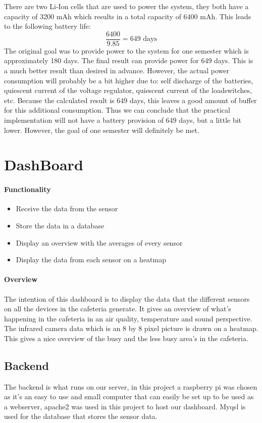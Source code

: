\documentclass[11pt,a4paper]{article}
\begin{document}
There are two Li-Ion cells that are used to power the system, they both have a capacity of 3200 mAh which results in a total capacity of 6400 mAh. This leads to the following battery life:
\begin{equation}
	\frac{6400}{9.85}=649 \text{ days}
\end{equation}
The original goal was to provide power to the system for one semester which is approximately 180 days. The final result can provide power for 649 days. This is a much better result than desired in advance. However, the actual power consumption will probably be a bit higher due to: self discharge of the batteries, quiescent current of the voltage regulator, quiescent current of the loadswitches, etc. Because the calculated result is 649 days, this leaves a good amount of buffer for this additional consumption. Thus we can conclude that the practical implementation will not have a battery provision of 649 days, but a little bit lower. However, the goal of one semester will definitely be met.


\section{DashBoard}
\paragraph{Functionality}
\begin{itemize}
	\item Receive the data from the sensor
	\item Store the data in a database
	\item Display an overview with the averages of every sensor
	\item Display the data from each sensor on a heatmap
\end{itemize}

\paragraph{Overview}
The intention of this dashboard is to display the data that the different sensors on all the devices in the cafeteria generate.
It gives an overview of what's happening in the cafeteria in an air quality, temperature and sound perspective. 
The infrared camera data which is an 8 by 8 pixel picture is drawn on a heatmap. 
This gives a nice overview of the busy and the less busy area's in the cafeteria.  

\subsection{Backend}
The backend is what runs on our server, in this project a raspberry pi was chosen as it's an easy to use and small computer
 that can easily be set up to be used as a webserver, apache2 was used in this project to host our dashboard. Myqsl is used for the database that stores the sensor data.
\end{document}
